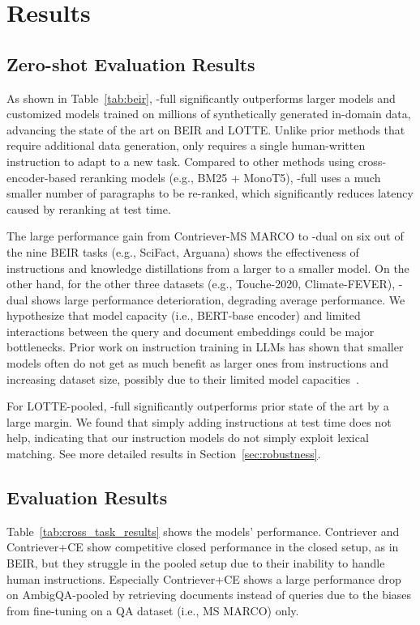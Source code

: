 \section{Results}
\subsection{Zero-shot Evaluation Results}

As shown in Table~\ref{tab:beir}, \model-full significantly outperforms larger models and customized models trained on millions of synthetically generated in-domain data, advancing the state of the art on BEIR and LOTTE.  
Unlike prior methods that require additional data generation, {\model only requires a single human-written instruction to adapt to a new task. }
Compared to other methods using cross-encoder-based reranking models (e.g., BM25 + MonoT5), \model-full uses a much smaller number of paragraphs to be re-ranked, which significantly reduces latency caused by reranking at test time. 


The large performance gain from Contriever-MS MARCO to \model-dual on six out of the nine BEIR tasks (e.g., SciFact, Arguana) shows the effectiveness of instructions and knowledge distillations from a larger to a smaller model.
{On the other hand, for the other three datasets (e.g., Touche-2020, Climate-FEVER), \model-dual shows large performance deterioration, degrading average performance. 
We hypothesize that model capacity (i.e., BERT-base encoder) and limited interactions between the query and document embeddings could be major bottlenecks. 
Prior work on instruction training in LLMs has shown that smaller models often do not get as much benefit as larger ones from instructions and increasing dataset size, possibly due to their limited model capacities~\cite{flan_palm,wang2022benchmarking}. 
}

For LOTTE-pooled, \model-full significantly outperforms prior state of the art by a large margin. 
We found that simply adding instructions at test time does not help, indicating that our instruction models do not simply exploit lexical matching. See more detailed results in Section~\ref{sec:robustness}.

\subsection{\task Evaluation Results}
Table~\ref{tab:cross_task_results} shows the models' \task performance. Contriever and Contriever+CE show competitive closed performance in the closed setup, as in BEIR, but they struggle in the pooled setup due to their inability to handle human instructions. 
{Especially Contriever+CE shows a large performance drop on AmbigQA-pooled by retrieving documents instead of queries due to the biases from fine-tuning on a QA dataset (i.e., MS MARCO) only.} 

